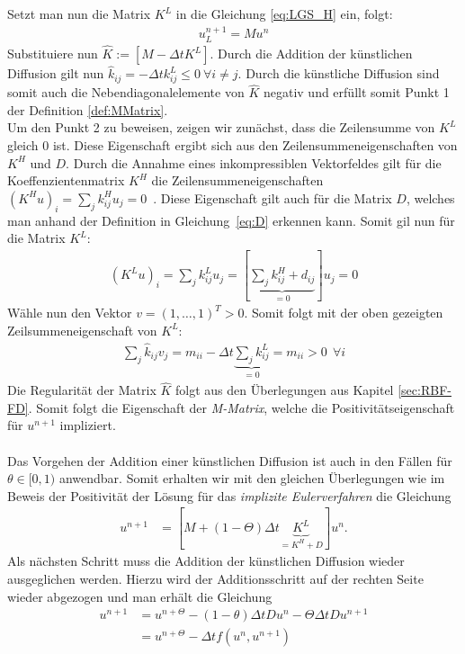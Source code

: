 \documentclass[a4paper,11pt]{article}
\begin{document}
Setzt man nun die Matrix $K^L$ in die Gleichung \eqref{eq:LGS_H} ein, folgt:
\begin{align}
 [M-\Delta tK^L]u_L^{n+1}=Mu^n
\end{align}
Substituiere nun $\widehat{K}:=[M-\Delta tK^L]$. Durch die Addition der künstlichen Diffusion gilt nun $\widehat{k}_{ij}=-\Delta tk_{ij}^L\le0~\forall i\neq j$. Durch die künstliche Diffusion sind somit auch die Nebendiagonalelemente von $\widehat{K}$ negativ und erfüllt somit Punkt 1 der Definition \ref{def:MMatrix}.\\
Um den Punkt 2 zu beweisen, zeigen wir zunächst, dass die Zeilensumme von $K^L$ gleich 0 ist. Diese Eigenschaft ergibt sich aus den Zeilensummeneigenschaften von $K^H$ und $D$. Durch die Annahme eines inkompressiblen Vektorfeldes gilt für die Koeffenzientenmatrix $K^H$ die Zeilensummeneigenschaften $(K^Hu)_i=\sum_{j}k_{ij}^Hu_j=0$~\cite{kuzmin2005algebraic}. Diese Eigenschaft gilt auch für die Matrix $D$, welches man anhand der Definition in Gleichung~\eqref{eq:D} erkennen kann. Somit gil nun für die Matrix $K^L$:
\begin{align}
 (K^Lu)_i=\sum_{j}k_{ij}^Lu_j=[\underbrace{\sum_{j}k_{ij}^H+d_{ij}}_{=0}]u_j=0
\end{align}
Wähle nun den Vektor $v=(1,\dots,1)^T>0$. Somit folgt mit der oben gezeigten Zeilsummeneigenschaft von $K^L$:
\begin{align}
 \sum_j \widehat{k}_{ij} v_j=m_{ii} - \Delta t\underbrace{\sum_j k_{ij}^L}_{=0}=m_{ii}>0~~\forall i
\end{align}
Die Regularität der Matrix $\widehat{K}$ folgt aus den Überlegungen aus Kapitel \ref{sec:RBF-FD}. Somit folgt die Eigenschaft der \textit{M-Matrix}, welche die Positivitätseigenschaft für $u^{n+1}$ impliziert.\\\\
Das Vorgehen der Addition einer künstlichen Diffusion ist auch in den Fällen für $\theta\in[0,1)$ anwendbar. Somit erhalten wir mit den gleichen Überlegungen wie im Beweis der Positivität der Lösung für das \textit{implizite Eulerverfahren} die Gleichung
\begin{align}
 [M-\Theta\Delta t\underbrace{K^L}_{\scriptscriptstyle=K^H+D}]u^{n+1}&=[M+(1-\Theta)\Delta t\underbrace{K^L}_{\scriptscriptstyle=K^H+D}]u^n.
\end{align}
Als nächsten Schritt muss die Addition der künstlichen Diffusion wieder ausgeglichen werden. Hierzu wird der Additionsschritt auf der rechten Seite wieder abgezogen und man erhält die Gleichung
\begin{align}
 [M-\Theta\Delta tK^L]u^{n+1}&=u^{n+\Theta} -(1-\theta)\Delta tDu^n-\Theta\Delta tDu^{n+1}\nonumber\\
 &=u^{n+\Theta}-\Delta tf(u^n,u^{n+1})\label{eq:zwischGleich}
\end{align}
\end{document}
